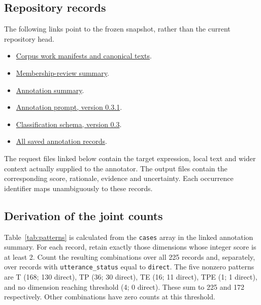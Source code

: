 \subsection{Repository records}

The following links point to the frozen snapshot, rather than the current repository head.
\begin{itemize}
\item \href{https://github.com/mannyrayner/let_me_count_the_ways/tree/662f77a398e884f9bf30601c3bbf433a722c9619/corpus/works/}{Corpus work manifests and canonical texts}.
\item \href{https://github.com/mannyrayner/let_me_count_the_ways/blob/662f77a398e884f9bf30601c3bbf433a722c9619/results/review/canonical_31_v0_11_ai_review_v1/summary.json}{Membership-review summary}.
\item \href{https://github.com/mannyrayner/let_me_count_the_ways/blob/662f77a398e884f9bf30601c3bbf433a722c9619/results/annotation/canonical_31_v0_11_v0_3_1/summary.json}{Annotation summary}.
\item \href{https://github.com/mannyrayner/let_me_count_the_ways/blob/662f77a398e884f9bf30601c3bbf433a722c9619/prompts/annotation/classify_passage_v0_3_1.md}{Annotation prompt, version 0.3.1}.
\item \href{https://github.com/mannyrayner/let_me_count_the_ways/blob/662f77a398e884f9bf30601c3bbf433a722c9619/prompts/annotation/classification_schema_v0_3.json}{Classification schema, version 0.3}.
\item \href{https://github.com/mannyrayner/let_me_count_the_ways/tree/662f77a398e884f9bf30601c3bbf433a722c9619/results/annotation/canonical_31_v0_11_v0_3_1/annotations/}{All saved annotation records}.
\end{itemize}

The request files linked below contain the target expression, local text and wider context actually supplied to the annotator. The output files contain the corresponding score, rationale, evidence and uncertainty. Each occurrence identifier maps unambiguously to these records.

\subsection{Derivation of the joint counts}

Table~\ref{tab:patterns} is calculated from the \texttt{cases} array in the linked annotation summary. For each record, retain exactly those dimensions whose integer score is at least 2. Count the resulting combinations over all 225 records and, separately, over records with \texttt{utterance\_status} equal to \texttt{direct}. The five nonzero patterns are T (168; 130 direct), TP (36; 30 direct), TE (16; 11 direct), TPE (1; 1 direct), and no dimension reaching threshold (4; 0 direct). These sum to 225 and 172 respectively. Other combinations have zero counts at this threshold.

